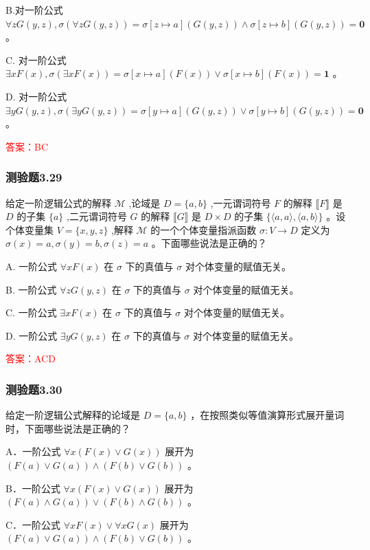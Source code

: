 \documentclass[UTF8, heading=true]{ctexart}
\begin{document}
B.对一阶公式 $\forall z G(y, z), \sigma(\forall z G(y, z))=\sigma[z \mapsto a](G(y, z)) \wedge \sigma[z \mapsto b](G(y, z))=\mathbf{0}$ 。

C. 对一阶公式 $\exists x F(x), \sigma(\exists x F(x))=\sigma[x \mapsto a](F(x)) \vee \sigma[x \mapsto b](F(x))=\mathbf{1}$ 。

D. 对一阶公式 $\exists y G(y, z), \sigma(\exists y G(y, z))=\sigma[y \mapsto a](G(y, z)) \vee \sigma[y \mapsto b](G(y, z))=\mathbf{0}$ 。

\textcolor{red}{答案：BC}

\subsubsection{测验题3.29}

给定一阶逻辑公式的解释 $\mathcal{M}$ ,论域是 $D=\{a, b\}$ ,一元谓词符号 $F$ 的解释 $\llbracket F \rrbracket$ 是 $D$ 的子集 $\{a\}$ ,二元谓词符号 $G$ 的解释 $\llbracket G \rrbracket$ 是 $D \times D$ 的子集 $\{\langle a, a\rangle,\langle a, b\rangle\}$ 。设个体变量集 $V=\{x, y, z\}$ ,解释 $\mathcal{M}$ 的一个个体变量指派函数 $\sigma: V \rightarrow D$ 定义为 $\sigma(x)=a, \sigma(y)=b, \sigma(z)=a$ 。下面哪些说法是正确的？

A.
一阶公式 $\forall x F(x)$ 在 $\sigma$ 下的真值与 $\sigma$ 对个体变量的赋值无关。

B.
一阶公式 $\forall z G(y, z)$ 在 $\sigma$ 下的真值与 $\sigma$ 对个体变量的赋值无关。

C.
一阶公式 $\exists x F(x)$ 在 $\sigma$ 下的真值与 $\sigma$ 对个体变量的赋值无关。

D.
一阶公式 $\exists y G(y, z)$ 在 $\sigma$ 下的真值与 $\sigma$ 对个体变量的赋值无关。

\textcolor{red}{答案：ACD}

\subsubsection{测验题3.30}

给定一阶逻辑公式解释的论域是 $D=\{a, b\}$ ，在按照类似等值演算形式展开量词时，下面哪些说法是正确的？

A．一阶公式 $\forall x(F(x) \vee G(x))$ 展开为 $(F(a) \vee G(a)) \wedge(F(b) \vee G(b))$ 。

B．一阶公式 $\forall x(F(x) \vee G(x))$ 展开为 $(F(a) \wedge G(a)) \vee(F(b) \wedge G(b))$ 。

C．一阶公式 $\forall x F(x) \vee \forall x G(x)$ 展开为 $(F(a) \vee G(a)) \wedge(F(b) \vee G(b))$ 。
\end{document}
